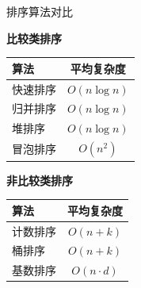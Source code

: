 \begin{genbox}{排序算法对比}
\centering
\begin{minipage}[c]{0.45\linewidth}
\centering
\textbf{比较类排序}\\[4pt]
\begin{tabular}{@{}lc@{}}
\toprule
算法 & 平均复杂度 \\
\midrule
快速排序 & \( O(n \log n) \) \\
归并排序 & \( O(n \log n) \) \\
堆排序 & \( O(n \log n) \) \\
冒泡排序 & \( O(n^2) \) \\
\bottomrule
\end{tabular}
\end{minipage}
\hfill
\begin{minipage}[c]{0.45\linewidth}
\centering
\textbf{非比较类排序}\\[4pt]
\begin{tabular}{@{}lc@{}}
\toprule
算法 & 平均复杂度 \\
\midrule
计数排序 & \( O(n+k) \) \\
桶排序 & \( O(n+k) \) \\
基数排序 & \( O(n \cdot d) \) \\
\bottomrule
\end{tabular}
\end{minipage}
\end{genbox}
